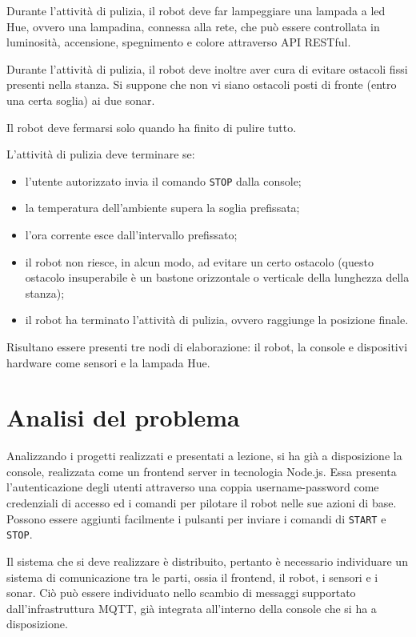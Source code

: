 Durante l'attività di pulizia, il robot deve far lampeggiare una lampada a led Hue, ovvero una lampadina, connessa alla rete, che può essere controllata in luminosità, accensione, spegnimento e colore attraverso API RESTful.

Durante l'attività di pulizia, il robot deve inoltre aver cura di evitare ostacoli fissi presenti nella stanza. Si suppone che non vi siano ostacoli posti di fronte (entro una certa soglia) ai due sonar.

Il robot deve fermarsi solo quando ha finito di pulire tutto.

L'attività di pulizia deve terminare se:
\begin{itemize}
\item l'utente autorizzato invia il comando \texttt{STOP} dalla console;
\item la temperatura dell'ambiente supera la soglia prefissata;
\item l'ora corrente esce dall'intervallo prefissato;
\item il robot non riesce, in alcun modo, ad evitare un certo ostacolo (questo ostacolo insuperabile è un bastone orizzontale o verticale della lunghezza della stanza);
\item il robot ha terminato l'attività di pulizia, ovvero raggiunge la posizione finale.
\end{itemize}

Risultano essere presenti tre nodi di elaborazione: il robot, la console e dispositivi hardware come sensori e la lampada Hue.

\section{Analisi del problema}
Analizzando i progetti realizzati e presentati a lezione, si ha già a disposizione la console, realizzata come un frontend server in tecnologia Node.js. Essa presenta l'autenticazione degli utenti attraverso una coppia username-password come credenziali di accesso ed i comandi per pilotare il robot nelle sue azioni di base. Possono essere aggiunti facilmente i pulsanti per inviare i comandi di \texttt{START} e \texttt{STOP}.

Il sistema che si deve realizzare è distribuito, pertanto è necessario individuare un sistema di comunicazione tra le parti, ossia il frontend, il robot, i sensori e i sonar. Ciò può essere individuato nello scambio di messaggi supportato dall'infrastruttura MQTT, già integrata all'interno della console che si ha a disposizione. 


